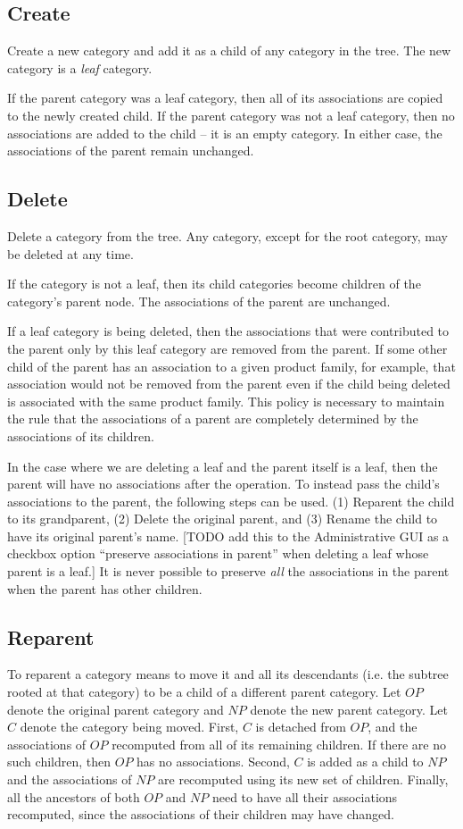 \documentclass[letterpaper, 12pt]{article}
\begin{document}
\subsection{Create}
Create a new category and add it as a child of any category in the tree.  The new category is a {\em leaf} category.
\par
If the parent category was a leaf category, then all of its associations are copied to the newly created child.  If the parent category was not a leaf category, then no associations are added to the child -- it is an empty category.   In either case, the associations of the parent remain unchanged.

\subsection{Delete}
Delete a category from the tree. Any category, except for the root category, may be deleted at any time.
\par
 If the category is not a leaf, then its child categories become children of the category's parent node.  The associations of the parent are unchanged.
\par
If a leaf category is being deleted, then the associations that were contributed to the parent only by this leaf category are removed from the parent.  If some other child of the parent has an association to a given product family, for example, that association would not be removed from the parent even if the child being deleted is associated with the same product family.  This policy is necessary to maintain the rule that the associations of a parent are completely determined by the associations of its children.
\par
In the case where we are deleting a leaf and the parent itself is a leaf, then the parent will have no associations after the operation.  To instead pass the child's associations to the parent, the following steps can be used.  (1) Reparent the child to its grandparent, (2) Delete the original parent, and (3) Rename the child to have its original parent's name. [TODO add this to the Administrative GUI as a checkbox option ``preserve associations in parent''  when deleting a leaf whose parent is a leaf.]  It is never possible to preserve {\em all} the associations in the parent when the parent has other children.

\subsection{Reparent}
To reparent a category means to move it and all its descendants (i.e. the subtree rooted at that category) to be a child of a different parent category. Let $OP$ denote the original parent category and $NP$ denote the new parent category.  Let $C$ denote the category being moved.  First, $C$ is detached from $OP$, and the associations of $OP$ recomputed from all of its remaining children.  If there are no such children, then $OP$ has no associations.  Second, $C$ is added as a child to $NP$ and the associations of $NP$ are recomputed using its new set of children.  Finally, all the ancestors of both $OP$ and $NP$ need to have all their associations recomputed, since the associations of their children may have changed.  
\end{document}
